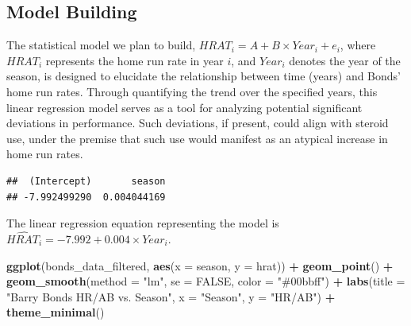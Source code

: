 \documentclass[
]{article}
\newenvironment{Shaded}{\begin{snugshade}}{\end{snugshade}}
\newcommand{\AttributeTok}[1]{\textcolor[rgb]{0.13,0.29,0.53}{#1}}
\newcommand{\ConstantTok}[1]{\textcolor[rgb]{0.56,0.35,0.01}{#1}}
\newcommand{\FunctionTok}[1]{\textcolor[rgb]{0.13,0.29,0.53}{\textbf{#1}}}
\newcommand{\NormalTok}[1]{#1}
\newcommand{\OtherTok}[1]{\textcolor[rgb]{0.56,0.35,0.01}{#1}}
\newcommand{\SpecialCharTok}[1]{\textcolor[rgb]{0.81,0.36,0.00}{\textbf{#1}}}
\newcommand{\StringTok}[1]{\textcolor[rgb]{0.31,0.60,0.02}{#1}}
\begin{document}
\subsection{Model Building}\label{model-building}

The statistical model we plan to build,
\(HRAT_{i} = A + B \times Year_{i} + e_{i}\), where \(HRAT_{i}\)
represents the home run rate in year \(i\), and \(Year_{i}\) denotes the
year of the season, is designed to elucidate the relationship between
time (years) and Bonds' home run rates. Through quantifying the trend
over the specified years, this linear regression model serves as a tool
for analyzing potential significant deviations in performance. Such
deviations, if present, could align with steroid use, under the premise
that such use would manifest as an atypical increase in home run rates.

\begin{Shaded}
\end{Shaded}

\begin{verbatim}
##  (Intercept)       season 
## -7.992499290  0.004044169
\end{verbatim}

The linear regression equation representing the model is
\(\hat{HRAT_{i}} = -7.992 + 0.004 \times Year_{i}\).

\begin{Shaded}
\begin{Highlighting}[]
\FunctionTok{ggplot}\NormalTok{(bonds\_data\_filtered, }\FunctionTok{aes}\NormalTok{(}\AttributeTok{x =}\NormalTok{ season, }\AttributeTok{y =}\NormalTok{ hrat)) }\SpecialCharTok{+} \FunctionTok{geom\_point}\NormalTok{() }\SpecialCharTok{+}
    \FunctionTok{geom\_smooth}\NormalTok{(}\AttributeTok{method =} \StringTok{"lm"}\NormalTok{, }\AttributeTok{se =} \ConstantTok{FALSE}\NormalTok{, }\AttributeTok{color =} \StringTok{"\#00bbff"}\NormalTok{) }\SpecialCharTok{+}
    \FunctionTok{labs}\NormalTok{(}\AttributeTok{title =} \StringTok{"Barry Bonds HR/AB vs. Season"}\NormalTok{, }\AttributeTok{x =} \StringTok{"Season"}\NormalTok{,}
        \AttributeTok{y =} \StringTok{"HR/AB"}\NormalTok{) }\SpecialCharTok{+} \FunctionTok{theme\_minimal}\NormalTok{()}
\end{Highlighting}
\end{Shaded}
\end{document}
